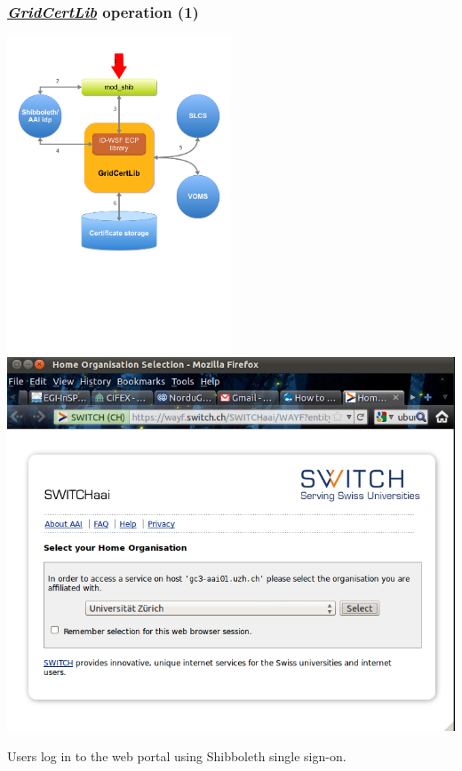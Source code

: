 \documentclass{beamer}
\newcommand{\+}{\vspace{1em}}
\newcommand{\GridCertLib}{\href{http://gridcertlib.googlecode.com/}{{\em GridCertLib}}}
\begin{document}
\begin{frame}
  \frametitle{\GridCertLib{} operation (1)}
  \begin{center}
    \includegraphics[width=0.5\textwidth,viewport=0 300 600 650]{architecture1}
    \includegraphics[height=0.50\textheight]{wayf}
  
    \+ Users log in to the web portal using Shibboleth single sign-on.
  \end{center}
\end{frame}
\end{document}
